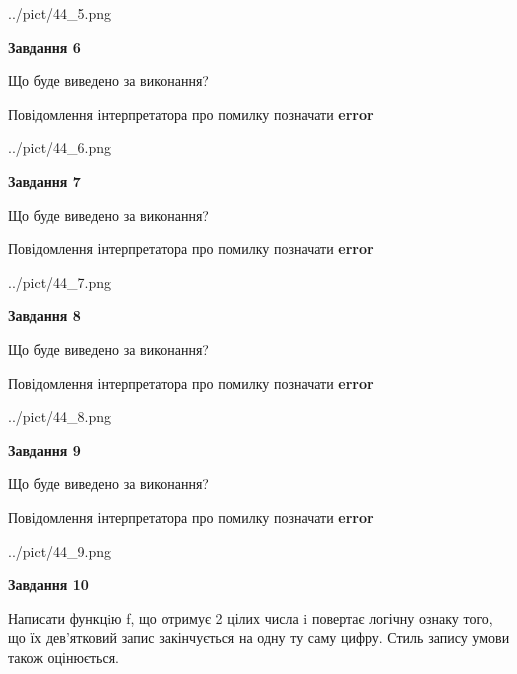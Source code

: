 \documentclass[12pt, ukrainian]{article}
\begin{document}
{\begin {large}
\begin{center}
	{../pict/44_5.png}
\end{center}
\newpage

{\begin {center}\textbf{Завдання 6}\end {center}}\par
Що буде виведено за виконання? \par
Повідомлення інтерпретатора про помилку позначати \textbf{error}

\begin{center}
	{../pict/44_6.png}
\end{center}
\newpage

{\begin {center}\textbf{Завдання 7}\end {center}}\par
Що буде виведено за виконання? \par
Повідомлення інтерпретатора про помилку позначати \textbf{error}

\begin{center}
	{../pict/44_7.png}
\end{center}
\newpage

{\begin {center}\textbf{Завдання 8}\end {center}}\par
Що буде виведено за виконання? \par
Повідомлення інтерпретатора про помилку позначати \textbf{error}

\begin{center}
	{../pict/44_8.png}
\end{center}
\newpage

{\begin {center}\textbf{Завдання 9}\end {center}}\par
Що буде виведено за виконання? \par
Повідомлення інтерпретатора про помилку позначати \textbf{error}

\begin{center}
	{../pict/44_9.png}
\end{center}
\newpage

{\begin {center}\textbf{Завдання 10}\end {center}}\par

Написати функцiю f, що отримує 2 цілих числа i повертає логічну ознаку того, що їх дев'ятковий запис закінчується на одну ту саму цифру. Стиль запису умови також оцінюється.\par
\newpage

\end {large}}
\end{document}
